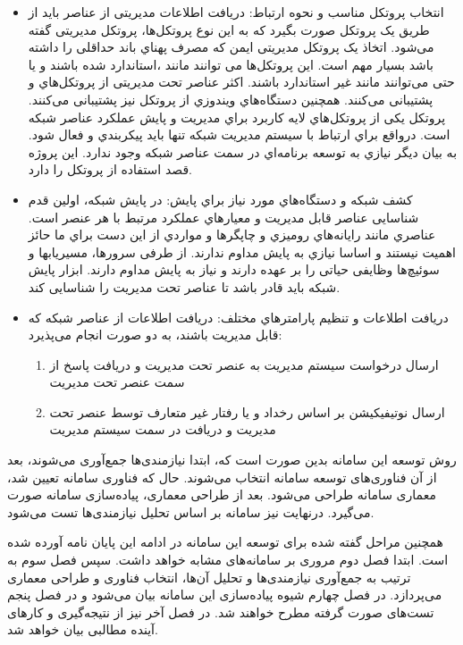 \begin{itemize}
    \item انتخاب پروتکل مناسب و نحوه ارتباط: دریافت اطلاعات مدیریتی از عناصر باید از طریق یک پروتکل صورت بگیرد که به این نوع پروتکل‌ها، پروتکل مدیریتی گفته می‌شود. اتخاذ یک پروتکل مدیریتی ایمن که مصرف پهناي باند حداقلی را داشته باشد بسیار مهم است. این پروتکل‌ها می توانند مانند ،استاندارد شده باشند و یا حتی می‌توانند مانند  غیر استاندارد باشند. اکثر عناصر تحت مدیریتی از پروتکل‌هاي  و   پشتیبانی می‌کنند. همچنین دستگاه‌هاي ویندوزي از پروتکل  نیز پشتیبانی می‌کنند. پروتکل   یکی از پروتکل‌هاي لایه کاربرد  براي مدیریت و پایش عملکرد عناصر شبکه است. درواقع براي ارتباط با سیستم مدیریت شبکه تنها باید پیکربندي و فعال شود. به بیان دیگر نیازي به توسعه برنامه‌اي در سمت عناصر شبکه وجود ندارد. این پروژه قصد استفاده از پروتکل  را دارد.
\newpage
    \item کشف شبکه و دستگاه‌هاي مورد نیاز براي پایش: در پایش شبکه، اولین قدم شناسایی عناصر قابل مدیریت و معیارهاي عملکرد مرتبط با هر عنصر است. عناصري مانند رایانه‌هاي رومیزي و چاپگرها و مواردي از این دست براي ما حائز اهمیت نیستند و اساسا نیازي به پایش مداوم ندارند. از طرفی سرورها، مسیریابها و سوئیچ‌ها وظایفی حیاتی را بر عهده دارند و نیاز به پایش مداوم دارند. ابزار پایش شبکه باید قادر باشد تا عناصر تحت مدیریت را شناسایی کند.
    \item دریافت اطلاعات و تنظیم پارامترهاي مختلف: دریافت اطلاعات از عناصر شبکه که قابل مدیریت باشند، به دو صورت انجام می‌پذیرد:
    \begin{enumerate}
        \item ارسال درخواست سیستم مدیریت به عنصر تحت مدیریت و دریافت پاسخ از سمت عنصر تحت مدیریت
        \item ارسال نوتیفیکیشن بر اساس رخداد و یا رفتار غیر متعارف توسط عنصر تحت مدیریت و دریافت در سمت سیستم مدیریت
    \end{enumerate}
\end{itemize}


روش توسعه این سامانه بدین صورت است که، ابتدا نیازمندی‌ها جمع‌آوری می‌شوند، بعد از آن فناوری‌های توسعه سامانه انتخاب می‌شوند. حال که فناوری سامانه تعیین شد، معماری سامانه طراحی می‌شود. بعد از طراحی معماری، پیاده‌سازی سامانه صورت می‌گیرد. درنهایت نیز سامانه بر اساس تحلیل نیازمندی‌ها تست می‌شود. 

همچنین مراحل گفته شده برای توسعه این سامانه در ادامه این پایان نامه آورده شده است. ابتدا فصل دوم مروری بر سامانه‌های مشابه خواهد داشت. سپس فصل سوم به ترتیب به جمع‌آوری نیازمندی‌ها و تحلیل آن‌ها، انتخاب فناوری و طراحی معماری می‌پردازد. در فصل چهارم شیوه پیاده‌سازی این سامانه بیان می‌شود و در فصل پنجم تست‌های صورت گرفته مطرح خواهند شد. در فصل آخر نیز از نتیجه‌گیری و کارهای آینده مطالبی بیان خواهد شد.

